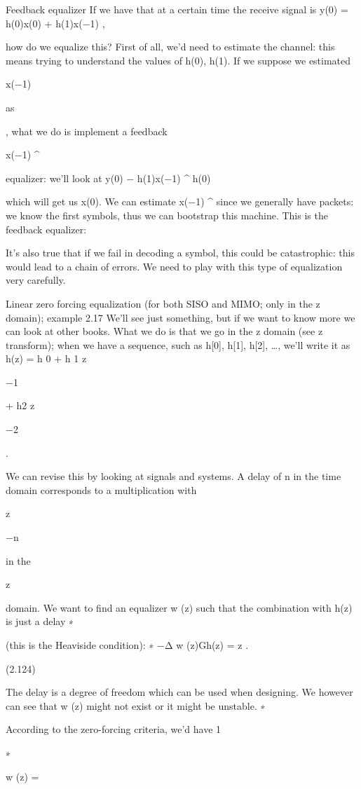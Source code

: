{Feedback equalizer If we have that at a certain time the receive signal is y(0) = h(0)x(0) + h(1)x(−1) ,

how do we equalize this?
First of all, we'd need to estimate the channel: this means trying to understand the values of h(0), h(1).
If we suppose we estimated

x(−1)

as

, what we do is implement a feedback

x(−1)
^

equalizer: we'll look at y(0) − h(1)x(−1)
^
h(0)

which will get us x(0).
We can estimate x(−1)
^
since we generally have packets: we know the first symbols,
thus we can bootstrap this machine.
This is the feedback equalizer:

It's also true that if we fail in decoding a symbol, this could be catastrophic: this would lead to a chain of errors.
We need to play with this type of equalization very carefully.

Linear zero forcing equalization (for both SISO and MIMO; only in the z domain); example 2.17 We'll see just something, but if we want to know more we can look at other books.
What we do is that we go in the z domain (see z transform); when we have a sequence,
such as h[0], h[1], h[2], …, we'll write it as h(z) = h 0 + h 1 z

−1

+ h2 z

−2

.

We can revise this by looking at signals and systems.
A delay of n in the time domain corresponds to a multiplication with

z

−n

in the

z

domain.
We want to find an equalizer w (z) such that the combination with h(z) is just a delay
∗

(this is the Heaviside condition):
∗
−Δ w (z)\sqrt Gh(z) = z
.

(2.124)

The delay is a degree of freedom which can be used when designing.
We however can see that w (z) might not exist or it might be unstable.
∗

According to the zero-forcing criteria, we'd have 1

∗

w (z) =

}
